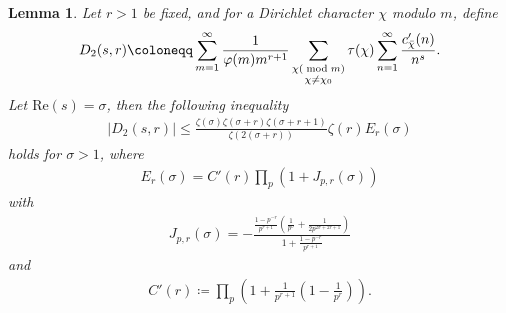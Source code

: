 \documentclass[12pt, oneside,reqno]{amsart}
\numberwithin{equation}{section}
\newtheorem{lemma}[theorem]{Lemma}
\begin{document}
\begin{lemma}\label{gausssumlemma}
Let $r>1$ be fixed, and for a Dirichlet character $\chi$ modulo $m$, define
\begin{align}\label{d2sksum}
D_2(s,r)
\coloneqq\sum_{m=1}^{\infty}\frac{1}{\varphi(m)m^{r+1}}\sum_{\substack{\chi(\bmod{m})\\\chi\ne\chi_0}}\tau(\chi)\sum_{n=1}^{\infty}\frac{c'_{\Bar{\chi}}(n)}{n^{s}}.
\end{align}
\noindent
Let $\mathrm{Re}(s)=\sigma$, then the following inequality
\begin{align*}
|D_2(s,r)|
\leq\frac{\zeta(\sigma)\zeta(\sigma+r)\zeta(\sigma+r+1)}{\zeta(2(\sigma+r))}\zeta(r)E_r(\sigma)
\end{align*}
holds for $\sigma>1$, where
\begin{align}\label{erdefinition}
E_r(\sigma)
=C'(r)\prod_{p}(1+J_{p,r}(\sigma))
\end{align}
with
\begin{align*}
J_{p,r}(\sigma)
=-\frac{\frac{1-p^{-r}}{p^{r+1}}\left(\frac{1}{p^{\sigma}}+\frac{1}{2p^{2\sigma+2r+1}}\right)}{1+\frac{1-p^{-r}}{p^{r+1}}}
\end{align*}
and
\begin{align}\label{cprimerdefinition}
C'(r)
\coloneqq\prod_{p}\left(1+\frac{1}{p^{r+1}}\left(1-\frac{1}{p^r}\right)\right).
\end{align}
\end{lemma}
\end{document}
